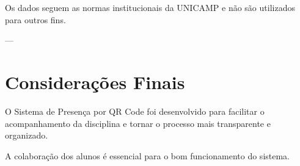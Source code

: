 \documentclass[12pt,a4paper]{article}
\begin{document}
Os dados seguem as normas institucionais da UNICAMP e não são utilizados para outros fins.

---

\section{Considerações Finais}

O Sistema de Presença por QR Code foi desenvolvido para facilitar o acompanhamento da disciplina e tornar o processo mais transparente e organizado.

A colaboração dos alunos é essencial para o bom funcionamento do sistema.
\end{document}
